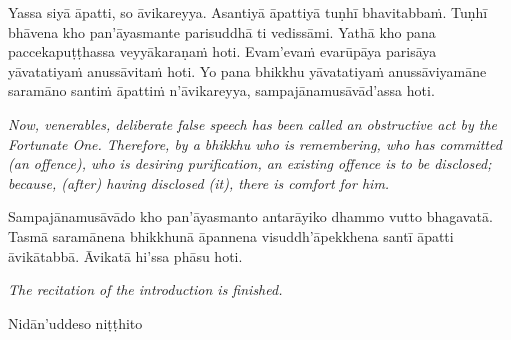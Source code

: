 \documentclass[11pt]{article}
\begin{document}
\begin{paracol}{2}
\begin{column}
\begin{flushleft}
Yassa siyā āpatti, so āvikareyya. Asantiyā āpattiyā tuṇhī bhavitabbaṁ. Tuṇhī bhāvena kho pan’āyasmante parisuddhā ti vedissāmi. Yathā kho pana paccekapuṭṭhassa veyyākaraṇaṁ hoti. Evam’evaṁ evarūpāya parisāya yāvatatiyaṁ anussāvitaṁ hoti. Yo pana bhikkhu yāvatatiyaṁ anussāviyamāne saramāno santiṁ āpattiṁ n’āvikareyya, sampajānamusāvād’assa hoti.
\switchcolumn*
\end{flushleft}

{\itshape\footnotesize
Now, venerables, deliberate false speech has been called an obstructive act by the Fortunate One. Therefore, by a bhikkhu who is remembering, who has committed (an offence), who is desiring purification, an existing offence is to be disclosed; because, (after) having disclosed (it), there is comfort for him.
}
\switchcolumn

\begin{flushleft}
Sampajānamusāvādo kho pan’āyasmanto antarāyiko dhammo vutto bhagavatā. Tasmā saramānena bhikkhunā āpannena visuddh’āpekkhena santī āpatti āvikātabbā. Āvikatā hi’ssa phāsu hoti.
\switchcolumn*
\end{flushleft}

{\itshape\footnotesize
The recitation of the introduction is finished.
}
\switchcolumn

\begin{flushleft}
Nidān’uddeso niṭṭhito
\switchcolumn*
\end{flushleft}


\end{column}
\end{paracol}
\end{document}
